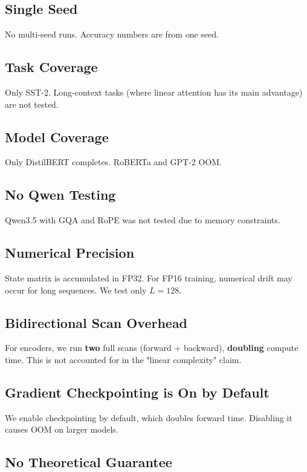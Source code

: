 \subsection{Single Seed}

No multi-seed runs. Accuracy numbers are from one seed.

\subsection{Task Coverage}

Only SST-2. Long-context tasks (where linear attention has its main 
advantage) are not tested.

\subsection{Model Coverage}

Only DistilBERT completes. RoBERTa and GPT-2 OOM.

\subsection{No Qwen Testing}

Qwen3.5 with GQA and RoPE was not tested due to memory constraints.

\subsection{Numerical Precision}

State matrix is accumulated in FP32. For FP16 training, numerical drift 
may occur for long sequences. We test only $L = 128$.

\subsection{Bidirectional Scan Overhead}

For encoders, we run \textbf{two} full scans (forward + backward), \textbf{doubling} 
compute time. This is not accounted for in the "linear complexity" claim.

\subsection{Gradient Checkpointing is On by Default}

We enable checkpointing by default, which doubles forward time. Disabling 
it causes OOM on larger models.

\subsection{No Theoretical Guarantee}

